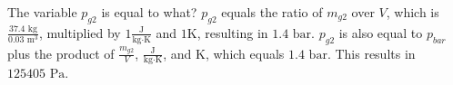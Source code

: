 The variable \( p_{g2} \) is equal to what? 
\( p_{g2} \) equals the ratio of \( m_{g2} \) over \( V \), which is \( \frac{37.4 \text{ kg}}{0.03 \text{ m}^3} \), multiplied by \( 1 \frac{\text{J}}{\text{kg} \cdot \text{K}} \) and \( 1 \text{K} \), resulting in \( 1.4 \text{ bar} \).
\( p_{g2} \) is also equal to \( p_{bar} \) plus the product of \( \frac{m_{g2}}{V} \), \( \frac{\text{J}}{\text{kg} \cdot \text{K}} \), and \( \text{K} \), which equals \( 1.4 \text{ bar} \).
This results in \( 125405 \text{ Pa} \).